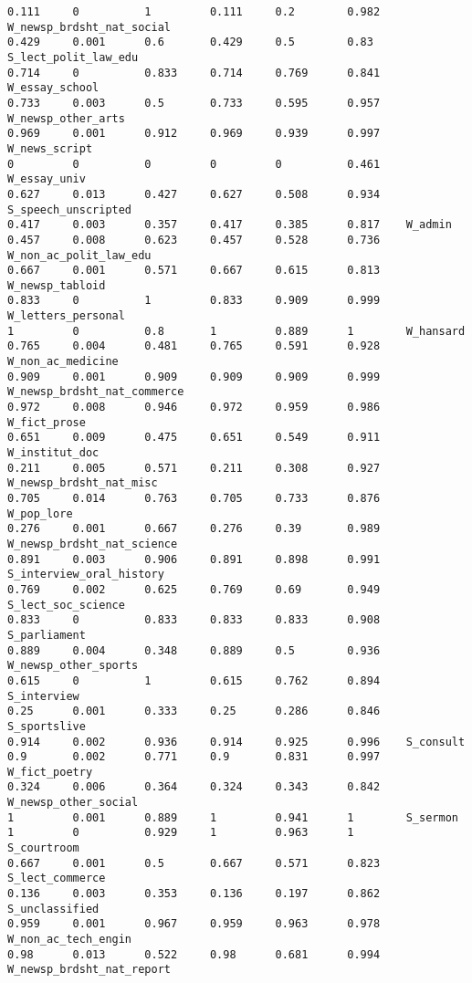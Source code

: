 {\begin{verbatim}
0.111     0          1         0.111     0.2        0.982    W_newsp_brdsht_nat_social
0.429     0.001      0.6       0.429     0.5        0.83     S_lect_polit_law_edu
0.714     0          0.833     0.714     0.769      0.841    W_essay_school
0.733     0.003      0.5       0.733     0.595      0.957    W_newsp_other_arts
0.969     0.001      0.912     0.969     0.939      0.997    W_news_script
0         0          0         0         0          0.461    W_essay_univ
0.627     0.013      0.427     0.627     0.508      0.934    S_speech_unscripted
0.417     0.003      0.357     0.417     0.385      0.817    W_admin
0.457     0.008      0.623     0.457     0.528      0.736    W_non_ac_polit_law_edu
0.667     0.001      0.571     0.667     0.615      0.813    W_newsp_tabloid
0.833     0          1         0.833     0.909      0.999    W_letters_personal
1         0          0.8       1         0.889      1        W_hansard
0.765     0.004      0.481     0.765     0.591      0.928    W_non_ac_medicine
0.909     0.001      0.909     0.909     0.909      0.999    W_newsp_brdsht_nat_commerce
0.972     0.008      0.946     0.972     0.959      0.986    W_fict_prose
0.651     0.009      0.475     0.651     0.549      0.911    W_institut_doc
0.211     0.005      0.571     0.211     0.308      0.927    W_newsp_brdsht_nat_misc
0.705     0.014      0.763     0.705     0.733      0.876    W_pop_lore
0.276     0.001      0.667     0.276     0.39       0.989    W_newsp_brdsht_nat_science
0.891     0.003      0.906     0.891     0.898      0.991    S_interview_oral_history
0.769     0.002      0.625     0.769     0.69       0.949    S_lect_soc_science
0.833     0          0.833     0.833     0.833      0.908    S_parliament
0.889     0.004      0.348     0.889     0.5        0.936    W_newsp_other_sports
0.615     0          1         0.615     0.762      0.894    S_interview
0.25      0.001      0.333     0.25      0.286      0.846    S_sportslive
0.914     0.002      0.936     0.914     0.925      0.996    S_consult
0.9       0.002      0.771     0.9       0.831      0.997    W_fict_poetry
0.324     0.006      0.364     0.324     0.343      0.842    W_newsp_other_social
1         0.001      0.889     1         0.941      1        S_sermon
1         0          0.929     1         0.963      1        S_courtroom
0.667     0.001      0.5       0.667     0.571      0.823    S_lect_commerce
0.136     0.003      0.353     0.136     0.197      0.862    S_unclassified
0.959     0.001      0.967     0.959     0.963      0.978    W_non_ac_tech_engin
0.98      0.013      0.522     0.98      0.681      0.994    W_newsp_brdsht_nat_report

\end{verbatim}}
